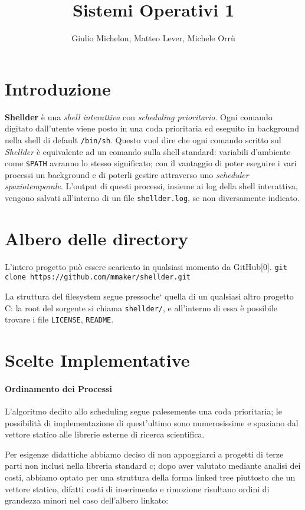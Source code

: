 \documentclass[11pt]{article}
\title{\textbf{Sistemi Operativi 1}}
\author{Giulio Michelon, Matteo Lever, Michele Orr\`u}
\date{}
\begin{document}
\maketitle

\section{Introduzione}

\textbf{Shellder} \`e una \emph{shell interattiva} con \emph{scheduling prioritario}.
Ogni comando digitato dall'utente viene posto in una coda prioritaria ed eseguito in background nella shell di
default \texttt{/bin/sh}. Questo vuol dire che ogni comando scritto sul \emph{Shellder} \`e equivalente ad un
comando sulla shell standard: variabili d'ambiente come \texttt{\$PATH} avranno lo stesso significato;
con il vantaggio di poter eseguire i vari processi un background e di poterli gestire attraverso uno 
\emph{scheduler spaziotemporale}.
L'output di questi processi, insieme ai log della shell interattiva, vengono salvati all'interno di un file 
\texttt{shellder.log}, se non diversamente indicato.

\section{Albero delle directory}

L'intero progetto pu\`o essere scaricato in qualsiasi momento da GitHub[0].
\texttt{git clone https://github.com/mmaker/shellder.git}

La struttura del filesystem segue pressoche` quella di un qualsiasi altro progetto C: la root del sorgente si chiama \texttt{shellder/}, e all'interno di essa \`e possibile trovare i file \texttt{LICENSE}, \texttt{README}.


\section{Scelte Implementative}

\paragraph{Ordinamento dei Processi\\}
L'algoritmo dedito allo scheduling segue palesemente una coda prioritaria;
le possibilit\`a di implementazione di quest'ultimo sono numerosissime e
spaziano dal vettore statico alle librerie esterne di ricerca scientifica.

Per esigenze didattiche abbiamo deciso di non appoggiarci a progetti di terze
parti non inclusi nella libreria standard c; dopo aver valutato mediante analisi
dei costi, abbiamo optato per una struttura della forma linked tree piuttosto
che un vettore statico, difatti costi di inserimento e rimozione risultano
ordini di grandezza minori nel caso dell'albero linkato:
\end{document}
